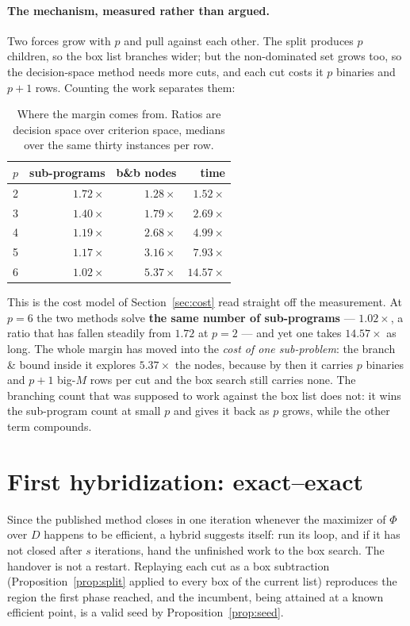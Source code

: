 \documentclass[11pt,a4paper]{article}
\newcommand{\Dset}{D}
\begin{document}
\paragraph{The mechanism, measured rather than argued.}  Two forces grow with
$p$ and pull against each other.  The split produces $p$ children, so the box
list branches wider; but the non-dominated set grows too, so the
decision-space method needs more cuts, and each cut costs it $p$ binaries and
$p+1$ rows.  Counting the work separates them:

\begin{table}[h]
\centering
\caption{Where the margin comes from.  Ratios are decision space over
criterion space, medians over the same thirty instances per row.}
\begin{tabular}{crrr}
\toprule
$p$ & sub-programs & b\&b nodes & time \\
\midrule
2 & $1.72\times$ & $1.28\times$ & $1.52\times$ \\
3 & $1.40\times$ & $1.79\times$ & $2.69\times$ \\
4 & $1.19\times$ & $2.68\times$ & $4.99\times$ \\
5 & $1.17\times$ & $3.16\times$ & $7.93\times$ \\
6 & $\mathbf{1.02\times}$ & $\mathbf{5.37\times}$ & $\mathbf{14.57\times}$ \\
\bottomrule
\end{tabular}
\end{table}

\noindent
This is the cost model of Section~\ref{sec:cost} read straight off the
measurement.  At $p = 6$ the two methods solve \textbf{the same number of
sub-programs} --- $1.02\times$, a ratio that has fallen steadily from $1.72$ at
$p=2$ --- and yet one takes $14.57\times$ as long.  The whole margin has moved
into the \emph{cost of one sub-problem}: the branch \& bound inside it explores
$5.37\times$ the nodes, because by then it carries $p$ binaries and $p+1$
big-$M$ rows per cut and the box search still carries none.  The branching
count that was supposed to work against the box list does not: it wins the
sub-program count at small $p$ and gives it back as $p$ grows, while the other
term compounds.

\section{First hybridization: exact--exact}

Since the published method closes in one iteration whenever the maximizer of
$\Phi$ over $\Dset$ happens to be efficient, a hybrid suggests itself: run its
loop, and if it has not closed after $s$ iterations, hand the unfinished work
to the box search. The handover is not a restart. Replaying each cut as a box
subtraction (Proposition~\ref{prop:split} applied to every box of the current
list) reproduces the region the first phase reached, and the incumbent, being
attained at a known efficient point, is a valid seed by
Proposition~\ref{prop:seed}.
\end{document}

